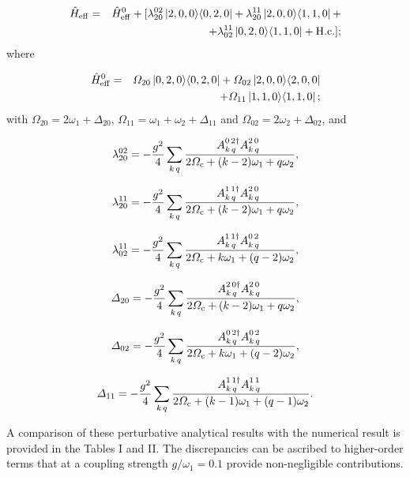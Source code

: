 \documentclass[aps,pra,twocolumn,floatfix,longbibliography, superscriptaddress]{revtex4-1}
\newcommand{\ketbra}[2]{\left| #1 \rangle \langle #2 \right|}
\newcommand{\nn}{\nonumber}
\newcommand{\be}{\begin{equation}}
\newcommand{\ee}{\end{equation}}
\newcommand{\bea}{\begin{eqnarray}}
\newcommand{\eea}{\end{eqnarray}}
\begin{document}
\bea
\hat H_{\rm eff}&=&\hat H_{\rm eff}^0+[ \lambda_{20}^{02} \nn \ketbra{2,0,0}{0,2,0}
+\lambda_{20}^{11} \ketbra{2,0,0}{1,1,0}+ \\ &&
+\lambda_{02}^{11} \ketbra{0,2,0}{1,1,0}+
{\rm H.c.}];
\eea
where

\bea
\hat H_{\rm eff}^0&=& \Omega_{20} \ketbra{0,2,0}{0,2,0}\nn
+ \Omega_{02} \ketbra{2,0,0}{2,0,0}\\ &&+\Omega_{11}\ketbra{1,1,0}{1,1,0};
\eea
with $\Omega_{20}=2\omega_1+\Delta_{20}$, $\Omega_{11}=\omega_1+\omega_2+\Delta_{11}$  and $\Omega_{02}=2\omega_2+\Delta_{02}$, and



\be
\lambda_{20}^{02}=-\frac{ g^2}{4}\sum_{k\,q}\frac{A_{k\,q}^{ 0\,2\dag} A_{k\,q}^{2\,0\phantom{\dag}}}{2\Omega_{\rm c}+(k-2)\omega_1+q\omega_2},
\ee	

\be
\lambda_{20}^{11}=-\frac{ g^2}{4}\sum_{k\,q}\frac{A_{ k\,q}^{1\,1\dag } A_{k\,q}^{2\,0\phantom{\dag}}}{2\Omega_{\rm c}+(k-2)\omega_1+q\omega_2},
\ee	

\be
\lambda_{02}^{11}=-\frac{ g^2}{4}\sum_{k\,q}\frac{A_{ k\,q}^{1\,1\dag } A_{k\,q}^{0\,2\phantom{\dag}}}{2\Omega_{\rm c}+k\omega_1+(q-2)\omega_2},
\ee	

\be
\Delta_{20}=-\frac{ g^2}{4}\sum_{k\,q}\frac{A_{k\,q}^{ 2\,0\dag} A_{k\,q}^{ 2\,0\phantom{\dag}}}{2\Omega_{\rm c}+(k-2)\omega_1+q\omega_2},
\ee	

\be
\Delta_{02}=-\frac{ g^2}{4}\sum_{k\,q}\frac{A_{k\,q}^{0\,2\dag } A_{k\,q}^{ 0\,2\phantom{\dag}}}{2\Omega_{\rm c}+k\omega_1+(q-2)\omega_2},
\ee	

\be
\Delta_{11}=-\frac{ g^2}{4}\sum_{k\,q}\frac{A_{k\,q}^{ 1\,1\dag} A_{k\,q}^{1\,1\phantom{\dag}}}{2\Omega_{\rm c}+(k-1)\omega_1+(q-1)\omega_2}.
\ee	

A comparison of these perturbative analytical results with the numerical result is provided in the Tables I and II. The discrepancies can be ascribed to higher-order terms that at a coupling strength $g/ \omega_1 = 0.1$ provide non-negligible contributions. 

\end{document}
